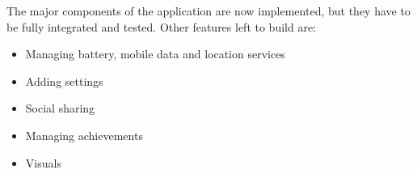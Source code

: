 \documentclass[a4paper,10pt]{article}
\begin{document}
The major components of the application are now implemented, but they have to be fully integrated and tested. Other features left to build are:

\begin{itemize}
    \item Managing battery, mobile data and location services
    \item Adding settings
    \item Social sharing
    \item Managing achievements
    \item Visuals
\end{itemize}
\end{document}
